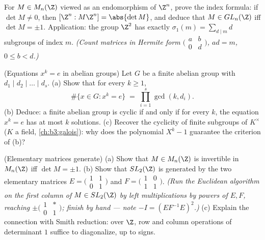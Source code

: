 \begin{exercise}[$\star\star\star$]\label{exo:b3:modules:10}
For $M \in M_n(\Z)$ viewed as an endomorphism of $\Z^n$, prove
the index formula: if $\det M \ne 0$, then
$[\Z^n : M\Z^n] = \abs{\det M}$, and deduce that $M \in GL_n(\Z)$
iff $\det M = \pm 1$. Application: the group $\Z^2$ has exactly
$\sigma_1(m) = \sum_{d \mid m} d$ subgroups of index $m$.
\emph{(Count matrices in Hermite form $\bigl(\begin{smallmatrix}
a & b\\ 0 & d\end{smallmatrix}\bigr)$, $ad = m$, $0 \leq b <
d$.)}
\end{exercise}

\begin{exercise}[$\star\star$]\label{exo:b3:modules:11}
(Equations $x^k = e$ in abelian groups) Let $G$ be a finite
abelian group with  $d_1 \mid d_2 \mid \dots
\mid d_s$.
(a) Show that for every $k \geq 1$,
\[
\#\{x \in G : x^k = e\} \;=\; \prod_{i=1}^{s}\gcd(k, d_i) .
\]
(b) Deduce: a finite abelian group is cyclic if and only if
for every $k$, the equation $x^k = e$ has at most $k$
solutions.
(c) Recover the cyclicity of finite subgroups of $K^\times$
($K$ a field, \cref{ch:b3:galois}): why does the polynomial
$X^k - 1$ guarantee the criterion of (b)?
\end{exercise}

\begin{exercise}[$\star\star\star$]\label{exo:b3:modules:12}
(Elementary matrices generate) (a) Show that $M \in M_n(\Z)$
is invertible in $M_n(\Z)$ iff $\det M = \pm1$.
(b) Show that $SL_2(\Z)$ is generated by the two elementary
matrices
$E = \bigl(\begin{smallmatrix}1 & 1\\ 0 &
1\end{smallmatrix}\bigr)$ and
$F = \bigl(\begin{smallmatrix}1 & 0\\ 1 &
1\end{smallmatrix}\bigr)$.
\emph{(Run the Euclidean algorithm on the first column of $M
\in SL_2(\Z)$ by left multiplications by powers of $E, F$,
reaching $\pm\bigl(\begin{smallmatrix}1 & *\\ 0 &
1\end{smallmatrix}\bigr)$; finish by hand --- note
$-I = (EF^{-1}E)^2$.)}
(c) Explain the connection with Smith reduction: over $\Z$,
row and column operations of determinant $1$ suffice to
diagonalize, up to signs.
\end{exercise}

